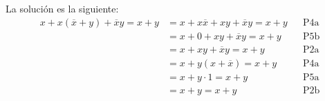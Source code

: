 \documentclass[answers]{exam}
\begin{document}
\begin{questions}
   \vspace{-2em}
  \begin{solution}
    La solución es la siguiente:
    \begin{align*}
      x+x(\overline{x}+y)+\overline{x}y = x+y
      &= x+x\overline{x}+xy+\overline{x}y = x+y && \text{P4a} \\
      &= x+0+xy+\overline{x}y = x+y && \text{P5b} \\
      &= x+xy+\overline{x}y = x+y && \text{P2a} \\
      &= x+y(x+\overline{x}) = x+y && \text{P4a} \\
      &= x+y \cdot 1 = x+y && \text{P5a} \\
      &= x+y = x+y && \text{P2b}
    \end{align*}
  \end{solution}


\end{questions}
\end{document}
